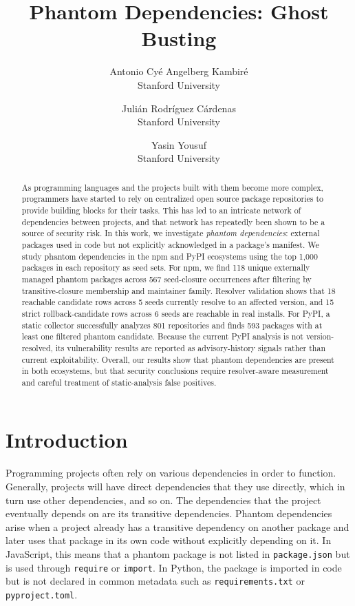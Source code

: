 \documentclass[letterpaper,twocolumn,10pt]{article}
\newcommand{\npm}{npm\xspace}
\newcommand{\pypi}{PyPI\xspace}
\begin{document}
\date{}
\title{\Large \bf Phantom Dependencies: Ghost Busting}

\author{
{\rm Antonio Cyé Angelberg Kambiré}\\
Stanford University
\and
{\rm Julián Rodríguez Cárdenas}\\
Stanford University
\and
{\rm Yasin Yousuf}\\
Stanford University
}

\maketitle

\begin{abstract}
As programming languages and the projects built with them become more complex,
programmers have started to rely on centralized open source package repositories
to provide building blocks for their tasks.  This has led to an intricate
network of dependencies between projects, and that network has repeatedly been
shown to be a source of security risk.  In this work, we investigate
\emph{phantom dependencies}: external packages used in code but not explicitly
acknowledged in a package's manifest.  We study phantom dependencies in the
\npm and \pypi ecosystems using the top 1,000 packages in each repository as
seed sets.  For \npm, we find 118 unique externally managed phantom packages
across 567 seed-closure occurrences after filtering by transitive-closure
membership and maintainer family.  Resolver validation shows that 18 reachable
candidate rows across 5 seeds currently resolve to an affected version, and 15
strict rollback-candidate rows across 6 seeds are reachable in real installs.
For \pypi, a static collector successfully analyzes 801 repositories and finds
593 packages with at least one filtered phantom candidate.  Because the current
\pypi analysis is not version-resolved, its vulnerability results are reported
as advisory-history signals rather than current exploitability.  Overall, our
results show that phantom dependencies are present in both ecosystems, but that
security conclusions require resolver-aware measurement and careful treatment
of static-analysis false positives.
\end{abstract}

\section{Introduction}

Programming projects often rely on various dependencies in order to function.
Generally, projects will have direct dependencies that they use directly, which
in turn use other dependencies, and so on.  The dependencies that the project
eventually depends on are its transitive dependencies.  Phantom dependencies
arise when a project already has a transitive dependency on another package and
later uses that package in its own code without explicitly depending on it.  In
JavaScript, this means that a phantom package is not listed in
\texttt{package.json} but is used through \texttt{require} or \texttt{import}.
In Python, the package is imported in code but is not declared in common
metadata such as \texttt{requirements.txt} or \texttt{pyproject.toml}.
\end{document}
